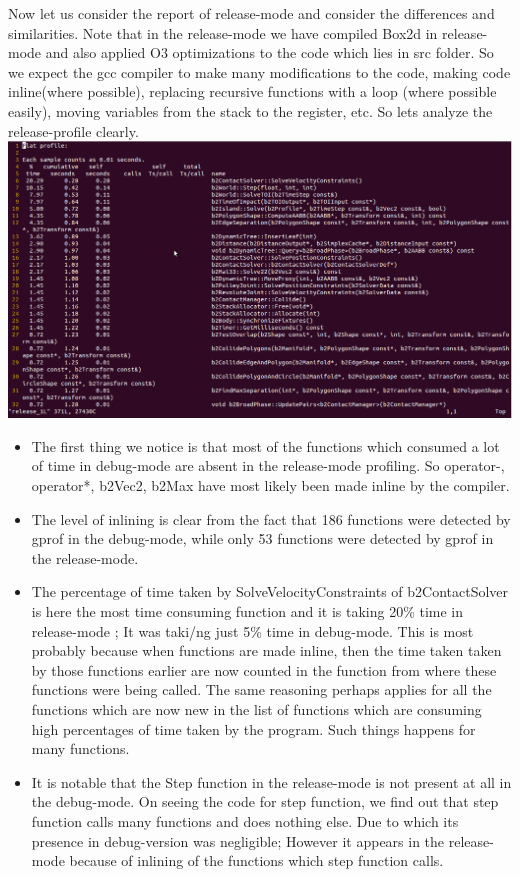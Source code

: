 \documentclass[english]{article}
\begin{document}
Now let us consider the report of release-mode and consider the differences and similarities. Note that in the release-mode we have compiled Box2d in release-mode and also applied O3 optimizations to the code which lies in src folder. So we expect the gcc compiler to make many modifications to the code, making code inline(where possible), replacing recursive functions with a loop (where possible easily), moving variables from the stack to the register, etc. So lets analyze the release-profile clearly.
\newline
\includegraphics[width=20cm]{doc/release_1L.png}
\begin{itemize}
\item The first thing we notice is that most of the functions which consumed a lot of time in debug-mode are absent in the release-mode profiling. So operator-, operator*, b2Vec2, b2Max have most likely been made inline by the compiler.
\item The level of inlining is clear from the fact that 186 functions were detected by gprof in the debug-mode, while only 53 functions were detected by gprof in the release-mode.
\item The percentage of time taken by SolveVelocityConstraints of b2ContactSolver is here the most time consuming function and it is taking 20\% time in release-mode ; It was taki/ng just 5\% time in debug-mode. This is most probably because when functions are made inline, then the time taken taken by those functions earlier are now counted in the function from where these functions were being called. The same reasoning perhaps applies for all the functions which are now new in the list of functions which are consuming high percentages of time taken by the program. Such things happens for many functions.
\item It is notable that the Step function in the release-mode is not present at all in the debug-mode. On seeing the code for step function, we find out that step function calls many functions and does nothing else. Due to which its presence in debug-version was negligible; However it appears in the release-mode because of inlining of the functions which step function calls.
\end{itemize} 
\end{document}

